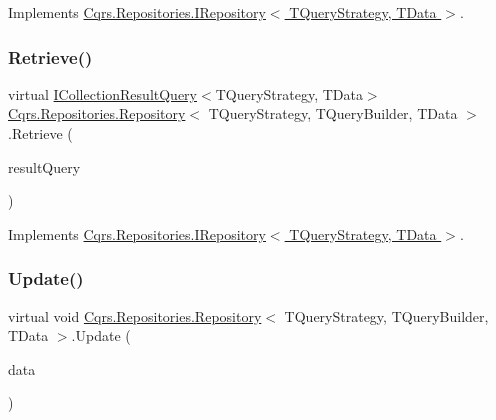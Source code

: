 Implements \hyperlink{interfaceCqrs_1_1Repositories_1_1IRepository_a65848508067b81e82da72af2063f2c07_a65848508067b81e82da72af2063f2c07}{Cqrs.\+Repositories.\+I\+Repository$<$ T\+Query\+Strategy, T\+Data $>$}.

\mbox{\label{classCqrs_1_1Repositories_1_1Repository_ab1136a454f981848d49e0d0a2f4b6a2f_ab1136a454f981848d49e0d0a2f4b6a2f}} 
\subsubsection{\texorpdfstring{Retrieve()}{Retrieve()}\hspace{0.1cm}{\footnotesize\ttfamily [2/2]}}
{\footnotesize\ttfamily virtual \hyperlink{interfaceCqrs_1_1Repositories_1_1Queries_1_1ICollectionResultQuery}{I\+Collection\+Result\+Query}$<$T\+Query\+Strategy, T\+Data$>$ \hyperlink{classCqrs_1_1Repositories_1_1Repository}{Cqrs.\+Repositories.\+Repository}$<$ T\+Query\+Strategy, T\+Query\+Builder, T\+Data $>$.Retrieve (\begin{DoxyParamCaption}\item[{\hyperlink{interfaceCqrs_1_1Repositories_1_1Queries_1_1ICollectionResultQuery}{I\+Collection\+Result\+Query}$<$ T\+Query\+Strategy, T\+Data $>$}]{result\+Query }\end{DoxyParamCaption})\hspace{0.3cm}{\ttfamily [virtual]}}



Implements \hyperlink{interfaceCqrs_1_1Repositories_1_1IRepository_a0faeb50aa395d63ccd81e66906360e81_a0faeb50aa395d63ccd81e66906360e81}{Cqrs.\+Repositories.\+I\+Repository$<$ T\+Query\+Strategy, T\+Data $>$}.

\mbox{\label{classCqrs_1_1Repositories_1_1Repository_a893276506e64034992d2c29d5ef11100_a893276506e64034992d2c29d5ef11100}} 
\subsubsection{\texorpdfstring{Update()}{Update()}}
{\footnotesize\ttfamily virtual void \hyperlink{classCqrs_1_1Repositories_1_1Repository}{Cqrs.\+Repositories.\+Repository}$<$ T\+Query\+Strategy, T\+Query\+Builder, T\+Data $>$.Update (\begin{DoxyParamCaption}\item[{T\+Data}]{data }\end{DoxyParamCaption})\hspace{0.3cm}{\ttfamily [virtual]}}



